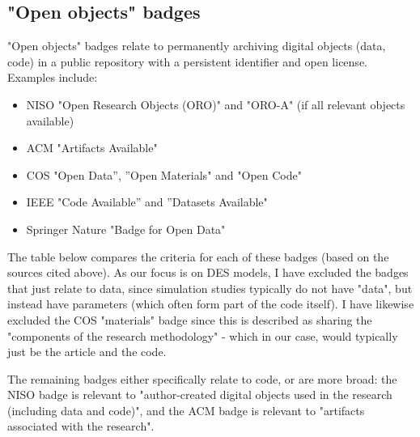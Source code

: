 \newpage
\subsection{"Open objects" badges}

"Open objects" badges relate to permanently archiving digital objects (data, code) in a public repository with a persistent identifier and open license.\autocite{niso_reproducibility_badging_and_definitions_working_group_reproducibility_2021} Examples include:
\begin{itemize}
    \item NISO "Open Research Objects (ORO)" and "ORO-A" (if all relevant objects available)\autocite{niso_reproducibility_badging_and_definitions_working_group_reproducibility_2021}
    \item ACM "Artifacts Available"\autocite{association_for_computing_machinery_acm_artifact_2020}
    \item COS "Open Data”, ”Open Materials" and "Open Code"\autocite{blohowiak_badges_2023}
    \item IEEE "Code Available” and ”Datasets Available"\autocite{institute_of_electrical_and_electronics_engineers_ieee_about_nodate}
    \item Springer Nature "Badge for Open Data"\autocite{springer_nature_springer_2018}
\end{itemize}

The table below compares the criteria for each of these badges (based on the sources cited above). As our focus is on DES models, I have excluded the badges that just relate to data, since simulation studies typically do not have "data", but instead have parameters (which often form part of the code itself). I have likewise excluded the COS "materials" badge since this is described as sharing the "components of the research methodology" - which in our case, would typically just be the article and the code.

The remaining badges either specifically relate to code, or are more broad: the NISO badge is relevant to "author-created digital objects used in the research (including data and code)",\autocite{niso_reproducibility_badging_and_definitions_working_group_reproducibility_2021} and the ACM badge is relevant to "artifacts associated with the research".\autocite{association_for_computing_machinery_acm_artifact_2020}

